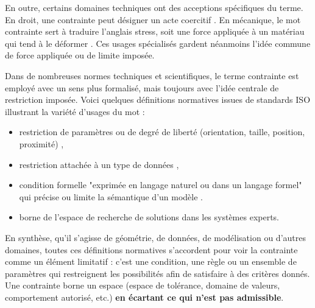 \documentclass[a4paper,12pt]{article}
\begin{document}
En outre, certains domaines techniques ont des acceptions spécifiques du terme. En droit, une contrainte peut désigner un acte coercitif \autocite{DefinitionContrainte}. En mécanique, le mot contrainte sert à traduire l’anglais stress, soit une force appliquée à un matériau qui tend à le déformer \autocite{francaiseContrainteDictionnaireLAcademie}. Ces usages spécialisés gardent néanmoins l’idée commune de force appliquée ou de limite imposée.

Dans de nombreuses normes techniques et scientifiques, le terme contrainte est employé avec un sens plus formalisé, mais toujours avec l’idée centrale de restriction imposée. Voici quelques définitions normatives issues de standards ISO illustrant la variété d’usages du mot : 
\begin{itemize}
\item restriction de paramètres ou de degré de liberté (orientation, taille, position, proximité) \autocite{ISO_4351},
\item restriction attachée à un type de données \autocite{ISO/CEI_2382},
\item condition formelle "exprimée en langage naturel ou dans un langage formel" qui précise ou limite la sémantique d’un modèle  \autocite{ISO_19103:2024}.
\item borne de l’espace de recherche de solutions \autocite{ISO/CEI_2382-28} dans les systèmes experts.
\end{itemize}

En synthèse, qu’il s’agisse de géométrie, de données, de modélisation ou d’autres domaines, toutes ces définitions normatives s’accordent pour voir la contrainte comme un élément limitatif : c’est une condition, une règle ou un ensemble de paramètres qui restreignent les possibilités afin de satisfaire à des critères donnés. Une contrainte borne un espace (espace de tolérance, domaine de valeurs, comportement autorisé, etc.) \textbf{en écartant ce qui n’est pas admissible}.
\end{document}
